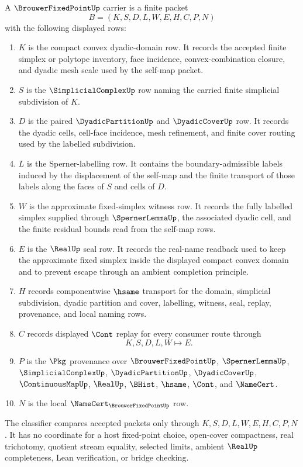 \begin{definition}
\label{def:brouwer-fixed-point-carrier}
A $\BrouwerFixedPointUp$ carrier is a finite packet
$$
B=(K,S,D,L,W,E,H,C,P,N)
$$
with the following displayed rows:
\begin{enumerate}
\item $K$ is the compact convex dyadic-domain row. It records the accepted finite simplex or polytope inventory, face incidence, convex-combination closure, and dyadic mesh scale used by the self-map packet.
\item $S$ is the $\SimplicialComplexUp$ row naming the carried finite simplicial subdivision of $K$.
\item $D$ is the paired $\DyadicPartitionUp$ and $\DyadicCoverUp$ row. It records the dyadic cells, cell-face incidence, mesh refinement, and finite cover routing used by the labelled subdivision.
\item $L$ is the Sperner-labelling row. It contains the boundary-admissible labels induced by the displacement of the self-map and the finite transport of those labels along the faces of $S$ and cells of $D$.
\item $W$ is the approximate fixed-simplex witness row. It records the fully labelled simplex supplied through $\SpernerLemmaUp$, the associated dyadic cell, and the finite residual bounds read from the self-map rows.
\item $E$ is the $\RealUp$ seal row. It records the real-name readback used to keep the approximate fixed simplex inside the displayed compact convex domain and to prevent escape through an ambient completion principle.
\item $H$ records componentwise $\hsame$ transport for the domain, simplicial subdivision, dyadic partition and cover, labelling, witness, seal, replay, provenance, and local naming rows.
\item $C$ records displayed $\Cont$ replay for every consumer route through
$$
K,S,D,L,W \longmapsto E .
$$
\item $P$ is the $\Pkg$ provenance over $\BrouwerFixedPointUp$, $\SpernerLemmaUp$, $\SimplicialComplexUp$, $\DyadicPartitionUp$, $\DyadicCoverUp$, $\ContinuousMapUp$, $\RealUp$, $\BHist$, $\hsame$, $\Cont$, and $\NameCert$.
\item $N$ is the local $\NameCert_{\BrouwerFixedPointUp}$ row.
\end{enumerate}
The classifier compares accepted packets only through $K,S,D,L,W,E,H,C,P,N$. It has no coordinate for a host fixed-point choice, open-cover compactness, real trichotomy, quotient stream equality, selected limits, ambient $\RealUp$ completeness, Lean verification, or bridge checking.
\end{definition}

